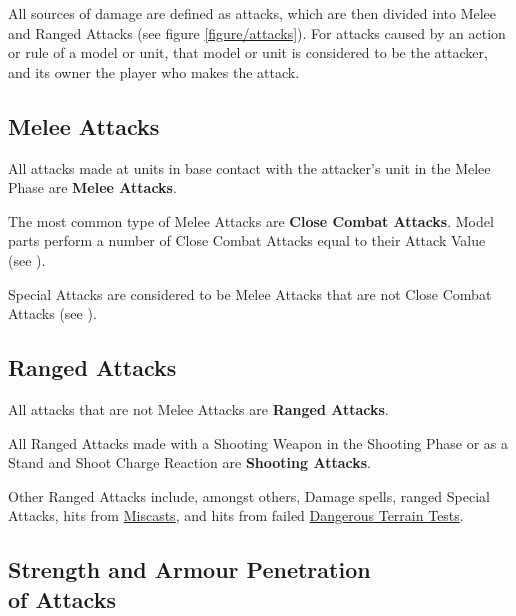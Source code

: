 All sources of damage are defined as attacks, which are then divided into Melee and Ranged Attacks (see figure \ref{figure/attacks}). For attacks caused by an action or rule of a model or unit, that model or unit is considered to be the attacker, and its owner the player who makes the attack.

\subsection{Melee Attacks}
\label{melee_attacks}

All attacks made at units in base contact with the attacker's unit in the Melee Phase are \textbf{Melee Attacks}.

The most common type of Melee Attacks are \textbf{Close Combat Attacks}. Model parts perform a number of Close Combat Attacks equal to their Attack Value (see ).

Special Attacks are considered to be Melee Attacks that are not Close Combat Attacks (see ).

\subsection{Ranged Attacks}
\label{ranged_attacks}

All attacks that are not Melee Attacks are \textbf{Ranged Attacks}.

All Ranged Attacks made with a Shooting Weapon in the Shooting Phase or as a Stand and Shoot Charge Reaction are \textbf{Shooting Attacks}.

Other Ranged Attacks include, amongst others, Damage spells, ranged Special Attacks, hits from \hyperref[miscast]{Miscasts}, and hits from failed \hyperref[dangerous_terrain]{Dangerous Terrain Tests}.

\columnbreak

\subsection[Strength and Armour Penetration of Attacks]{Strength and Armour Penetration\\ of Attacks}

